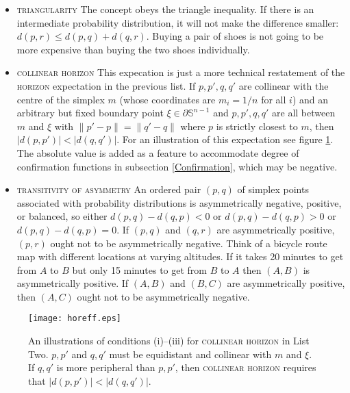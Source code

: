 \documentclass[11pt]{article}
\begin{document}
\begin{itemize}
\item \textsc{triangularity} The concept obeys the triangle
  inequality. If there is an intermediate probability distribution, it
  will not make the difference smaller: $d(p,r)\leq{}d(p,q)+d(q,r)$.
  Buying a pair of shoes is not going to be more expensive than buying
  the two shoes individually.
\item \textsc{collinear horizon} This expecation is just a more
  technical restatement of the \textsc{horizon} expectation in the
  previous list. If $p,p',q,q'$ are collinear with the centre of the
  simplex $m$ (whose coordinates are $m_{i}=1/n$ for all $i$) and an
  arbitrary but fixed boundary point $\xi\in\partial\mathbb{S}^{n-1}$
  and $p,p',q,q'$ are all between $m$ and $\xi$ with
  $\|p'-p\|=\|q'-q\|$ where $p$ is strictly closest to $m$, then
  $|d(p,p')|<|d(q,q')|$. For an illustration of this expectation see
  figure \ref{fig:conditions}. The absolute value is added as a
  feature to accommodate degree of confirmation functions in
  subsection \ref{Confirmation}, which may be negative.
\item \textsc{transitivity of asymmetry} An ordered pair $(p,q)$ of
  simplex points associated with probability distributions is
  asymmetrically negative, positive, or balanced, so either
  $d(p,q)-d(q,p)<0$ or $d(p,q)-d(q,p)>0$ or $d(p,q)-d(q,p)=0$. If
  $(p,q)$ and $(q,r)$ are asymmetrically positive, $(p,r)$ ought not
  to be asymmetrically negative. Think of a bicycle route map with
  different locations at varying altitudes. If it takes 20 minutes to
  get from $A$ to $B$ but only 15 minutes to get from $B$ to $A$ then
  $(A,B)$ is asymmetrically positive. If $(A,B)$ and $(B,C)$ are
  asymmetrically positive, then $(A,C)$ ought not to be asymmetrically
  negative.
\end{itemize}

\begin{figure}[ht]
  \begin{flushright}
    \begin{minipage}[h]{.7\linewidth}
      \texttt{[image: horeff.eps]}
      \caption{\footnotesize An illustrations of conditions (i)--(iii)
        for \textsc{collinear horizon} in List Two. $p,p'$ and $q,q'$
        must be equidistant and collinear with $m$ and $\xi$. If
        $q,q'$ is more peripheral than $p,p'$, then \textsc{collinear
          horizon} requires that $|d(p,p')|<|d(q,q')|$.}
      \label{fig:conditions}
    \end{minipage}
  \end{flushright}
\end{figure}
\end{document}
